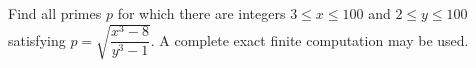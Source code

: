 Find all primes $p$ for which there are integers $3\le x\le100$ and $2\le y\le100$ satisfying $p=\sqrt{\dfrac{x^3-8}{y^3-1}}$. A complete exact finite computation may be used.
